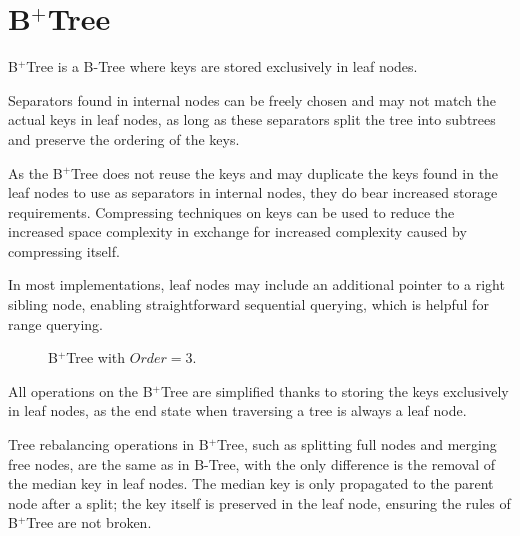 \section{B$^+$Tree}

\begin{definition}
  B$^+$Tree is a B-Tree where keys are stored exclusively in leaf nodes.
\end{definition}

Separators found in internal nodes can be freely chosen and may not match the actual keys in leaf nodes, as long as these separators split the tree into subtrees and preserve the ordering of the keys.

As the B$^+$Tree does not reuse the keys and may duplicate the keys found in the leaf nodes to use as separators in internal nodes, they do bear increased storage requirements. Compressing techniques on keys can be used to reduce the increased space complexity in exchange for increased complexity caused by compressing itself.

In most implementations, leaf nodes may include an additional pointer to a right sibling node, enabling straightforward sequential querying, which is helpful for range querying.

\begin{figure}[H]
  \centering
  
  \caption{B$^+$Tree with $\mathit{Order} = 3$.}
  \label{figure:b-plus-tree}
\end{figure}

All operations on the B$^+$Tree are simplified thanks to storing the keys exclusively in leaf nodes, as the end state when traversing a tree is always a leaf node.

Tree rebalancing operations in B$^+$Tree, such as splitting full nodes and merging free nodes, are the same as in B-Tree, with the only difference is the removal of the median key in leaf nodes. The median key is only propagated to the parent node after a split; the key itself is preserved in the leaf node, ensuring the rules of B$^+$Tree are not broken.